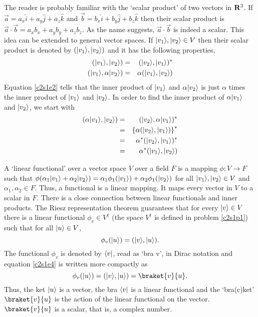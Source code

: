 The reader is probably familiar with the `scalar product' of two vectors in
$\mathbf{R}^3$. If $\vec{a} = a_x\hat{i} + a_y\hat{j} + a_z\hat{k}$ and $\vec{b} =
b_x\hat{i} + b_y\hat{j} + b_z\hat{k}$ then their scalar product is $\vec{a}
\cdot\vec{b} = a_xb_x + a_yb_y + a_zb_z$. As the name suggests, $\vec{a}\cdot
\vec{b}$ is indeed a scalar. This idea can be extended to general vector spaces.
If $\lvert v_1\rangle, \lvert v_2\rangle \in V$ then their scalar product is denoted by 
$(\lvert v_1\rangle, \lvert v_2\rangle)$ and it has the following properties,
\begin{eqnarray}
(\lvert v_1\rangle, \lvert v_2\rangle) &=& (\lvert v_2\rangle, \lvert v_1\rangle)^\ast \label{c2s1e1} \\
(\lvert v_1\rangle, \alpha\lvert v_2\rangle) &=& \alpha (\lvert v_1\rangle, \lvert v_2\rangle) \label{c2s1e2} 
\end{eqnarray}
Equation \eqref{c2s1e2} tells that the inner product of $\lvert v_1\rangle$ and
$\alpha\lvert v_2\rangle$ is just $\alpha$ times the inner product of $\lvert v_1\rangle$
and $\lvert v_2\rangle$. In order to find the inner product of $\alpha\lvert v_1\rangle$
and $\lvert v_2\rangle$, we start with
\begin{eqnarray}
(\alpha\lvert v_1\rangle, \lvert v_2\rangle) &=& (\lvert v_2\rangle, \alpha\lvert v_1\rangle)^\ast \nonumber \\
 &=& \left\{\alpha(\lvert v_2\rangle, \lvert v_1\rangle)\right\}^\ast \nonumber \\
 &=& \alpha^\ast(\lvert v_2\rangle, \lvert v_1\rangle)^\ast \nonumber \\
 &=& \alpha^\ast (\lvert v_1\rangle, \lvert v_2\rangle) \label{c2s1e3}
\end{eqnarray}


A `linear functional' over a vector space $V$ over a field $F$ is a mapping
$\phi: V \rightarrow F$ such that $\phi(\alpha_1\lvert v_1\rangle + \alpha_2\lvert v_2\rangle)
= \alpha_1\phi_1(\lvert v_1\rangle) + \alpha_2\phi_1(\lvert v_2\rangle)$ for all $\lvert v_1\rangle,
\lvert v_2\rangle \in V$ and $\alpha_1, \alpha_2 \in F$. Thus, a functional is a linear
mapping. It maps every vector in $V$ to a scalar in $F$. There is a close
connection between linear functionals and inner products. The Riesz representation
theorem \cite{kreyszig1978introductory} guarantees that for every $\lvert v\rangle \in V$
there is a linear functional $\phi_v \in V^\dagger$ (the space $V^\dagger$ is
defined in problem \ref{c2s1p1}) such that for all $\lvert u\rangle \in V$,
\begin{equation}\label{c2s1e4}
\phi_v(\lvert u\rangle) = (\lvert v\rangle, \lvert u\rangle).
\end{equation}
The functional $\phi_v$ is denoted by $\langle v\rvert$, read as `bra v', in Dirac 
notation and equation \eqref{c2s1e4} is written more compactly as
\begin{equation}\label{c2e1e5}
\phi_v(\ket{u}) = (\ket{v}, \ket{u}) = \braket{v}{u}.
\end{equation}
Thus, the ket $\lvert u\rangle$ is a vector, the bra $\langle v\rvert$ is a linear functional 
and the `bra(c)ket' $\braket{v}{u}$ is the action of the linear functional on
the vector. $\braket{v}{u}$ is a scalar, that is, a complex number.

